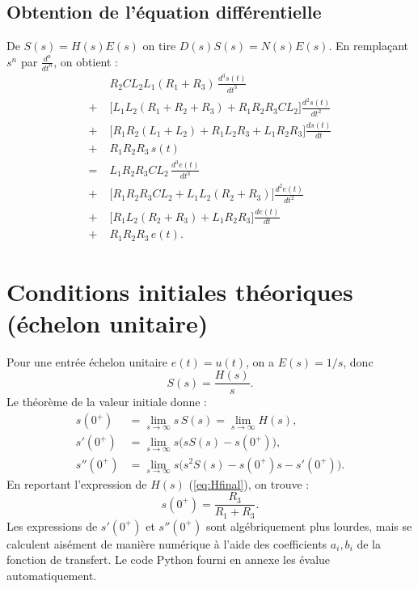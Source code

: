 \documentclass[12pt,a4paper]{article}
\begin{document}
\subsection{Obtention de l'équation différentielle}
De \(S(s) = H(s) E(s)\) on tire \(D(s) S(s) = N(s) E(s)\).  
En remplaçant \(s^n\) par \(\frac{d^n}{dt^n}\), on obtient :
\begin{equation}
\boxed{
\begin{aligned}
&R_2 C L_2 L_1 (R_1+R_3)\, \frac{d^3 s(t)}{dt^3} \\
+ &\bigl[ L_1 L_2 (R_1+R_2+R_3) + R_1 R_2 R_3 C L_2 \bigr] \frac{d^2 s(t)}{dt^2} \\
+ &\bigl[ R_1 R_2 (L_1+L_2) + R_1 L_2 R_3 + L_1 R_2 R_3 \bigr] \frac{ds(t)}{dt} \\
+ &R_1 R_2 R_3 \, s(t) \\[4pt]
= \;& L_1 R_2 R_3 C L_2\, \frac{d^3 e(t)}{dt^3} \\
+ &\bigl[ R_1 R_2 R_3 C L_2 + L_1 L_2 (R_2+R_3) \bigr] \frac{d^2 e(t)}{dt^2} \\
+ &\bigl[ R_1 L_2 (R_2+R_3) + L_1 R_2 R_3 \bigr] \frac{de(t)}{dt} \\
+ &R_1 R_2 R_3 \, e(t) .
\end{aligned}}
\label{eq:equadiff}
\end{equation}

\section{Conditions initiales théoriques (échelon unitaire)}

Pour une entrée échelon unitaire \(e(t) = u(t)\), on a \(E(s) = 1/s\), donc
\[
S(s) = \frac{H(s)}{s}.
\]
Le théorème de la valeur initiale donne :
\begin{align}
s(0^+) &= \lim_{s\to\infty} s\,S(s) = \lim_{s\to\infty} H(s) , \\
s'(0^+) &= \lim_{s\to\infty} s\bigl(s S(s) - s(0^+)\bigr) , \\
s''(0^+) &= \lim_{s\to\infty} s\bigl(s^2 S(s) - s(0^+) s - s'(0^+)\bigr) .
\end{align}
En reportant l'expression de \(H(s)\) (\ref{eq:Hfinal}), on trouve :
\begin{equation}
\boxed{
s(0^+) = \frac{R_3}{R_1 + R_3} .
}
\end{equation}
Les expressions de \(s'(0^+)\) et \(s''(0^+)\) sont algébriquement plus lourdes, mais se calculent aisément de manière numérique à l'aide des coefficients \(a_i, b_i\) de la fonction de transfert. Le code Python fourni en annexe les évalue automatiquement.
\end{document}
